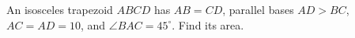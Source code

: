 An isosceles trapezoid $ABCD$ has $AB=CD$, parallel bases $AD>BC$, $AC=AD=10$, and $\angle BAC=45^\circ$. Find its area.
